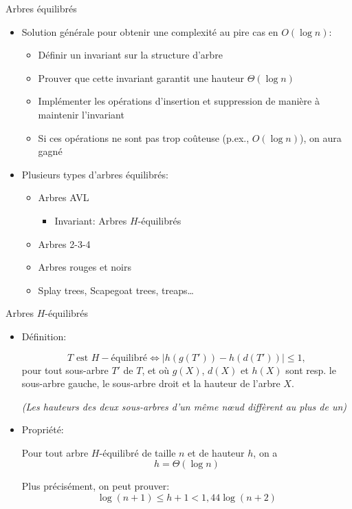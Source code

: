 \begin{frame}{Arbres équilibrés}
\begin{itemize}
\item Solution générale pour obtenir une complexité au pire cas en $O(\log n)$:%
\begin{itemize}
\item Définir un \alert{invariant} sur la structure d'arbre
\item Prouver que cette invariant garantit une hauteur $\Theta(\log n)$
\item Implémenter les opérations d'insertion et suppression de manière à maintenir l'invariant
\item Si ces opérations ne sont pas trop coûteuse (p.ex., $O(\log
  n)$), on aura gagné
\end{itemize}

\bigskip

\item Plusieurs types d'arbres équilibrés:
\begin{itemize}
\item \alert{Arbres AVL}
\begin{itemize}
\item \alert{Invariant: Arbres $H$-équilibrés}
\end{itemize}
\item Arbres 2-3-4
\item Arbres rouges et noirs
\item Splay trees, Scapegoat trees, treaps\ldots
\end{itemize}
\end{itemize}
\end{frame}

\begin{frame}{Arbres $H$-équilibrés}
\begin{itemize}
\item \alert{Définition:}

$$T\mbox{ est }H-\mbox{équilibré}\Leftrightarrow |h(g(T'))-h(d(T'))|\leq 1,$$
pour tout sous-arbre $T'$ de $T$, et où $g(X)$, $d(X)$ et $h(X)$ sont resp. le sous-arbre gauche, le sous-arbre droit et la hauteur de l'arbre $X$.

\medskip

\emph{(Les hauteurs des deux sous-arbres d'un même n\oe ud diffèrent au plus de un)}

\bigskip

\item \alert{Propriété:}

Pour tout arbre $H$-équilibré de taille $n$ et de hauteur $h$, on a 
$$h=\Theta(\log n)$$

Plus précisément, on peut prouver:
 $$\log(n+1)\leq h+1< 1,44 \log(n+2)$$
\end{itemize}

\end{frame}

